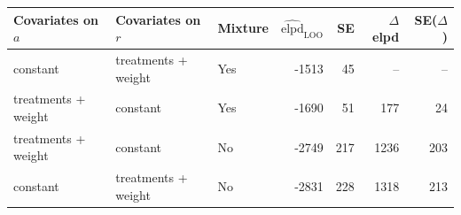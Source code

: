 \begin{tabular}{lllrrrr}
\toprule
Covariates on $a$ & Covariates on $r$ & Mixture & $\widehat{\mathrm{elpd}}_{\mathrm{LOO}}$ & SE & $\Delta$elpd & SE($\Delta$) \\
\midrule
constant & treatments + weight & Yes & -1513 & 45 & -- & -- \\
treatments + weight & constant & Yes & -1690 & 51 & 177 & 24 \\
treatments + weight & constant & No & -2749 & 217 & 1236 & 203 \\
constant & treatments + weight & No & -2831 & 228 & 1318 & 213 \\
\bottomrule
\end{tabular}
